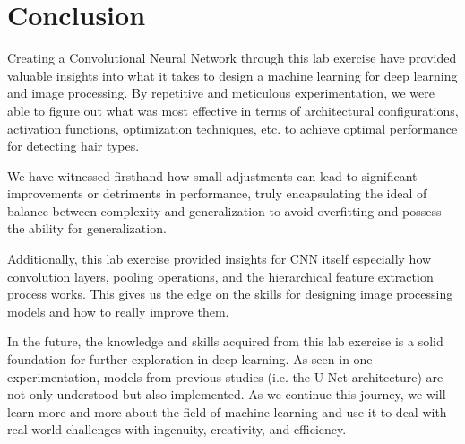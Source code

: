 \section{Conclusion}

Creating a Convolutional Neural Network through this lab exercise have provided valuable insights into what it takes to design a machine learning for deep learning and image processing. By repetitive and meticulous experimentation, we were able to figure out what was most effective in terms of architectural configurations, activation functions, optimization techniques, etc. to achieve optimal performance for detecting hair types.

We have witnessed firsthand how small adjustments can lead to significant improvements or detriments in performance, truly encapsulating the ideal of balance between complexity and generalization to avoid overfitting and possess the ability for generalization. 

Additionally, this lab exercise provided insights for CNN itself especially how convolution layers, pooling operations, and the hierarchical feature extraction process works. This gives us the edge on the skills for designing image processing models and how to really improve them. 

In the future, the knowledge and skills acquired from this lab exercise is a solid foundation for further exploration in deep learning. As seen in one experimentation, models from previous studies (i.e. the U-Net architecture) are not only understood but also implemented. As we continue this journey, we will learn more and more about the field of machine learning and use it to deal with real-world challenges with ingenuity, creativity, and efficiency. 
